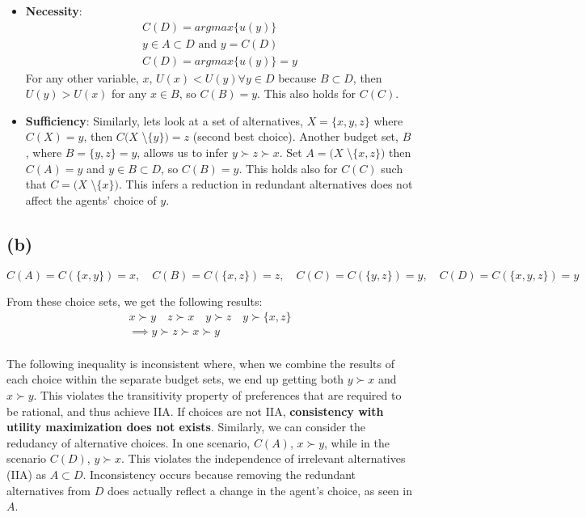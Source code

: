 \documentclass{article}
\begin{document}
\begin{itemize}
    \item \textbf{Necessity}:
        \begin{gather*}
        C(D) = argmax \{ u(y)\} \\
        y \in A\subset D \text{ and } y = C(D) \\ 
        C(D) = argmax \{ u(y)\} = y 
        \end{gather*}
    For any other variable, $x$, $U(x) < U(y) \forall y \in D$   because $B \subset D$, then $U(y) > U(x)$ for any $x \in B$, so $C(B) = y$. This also holds for $C(C)$.

    \item \textbf{Sufficiency}: Similarly, lets look at a set of alternatives, $X = \{x,y,z\}$ where $C(X) = y$, then $C(X$ \textbackslash $\{y\}) = z$ (second best choice). Another budget set, $B$, where $B = \{y,z\} = y$, allows us to infer $ y \succ z \succ x$. Set $A = (X$ \textbackslash $\{x,z\})$ then $C(A) = y$ and $y \in B \subset D$, so $C(B) = y$. This holds also for $C(C)$ such that $C = (X$ \textbackslash $\{x\})$. This infers a reduction in redundant alternatives does not affect the agents' choice of $y$. 
\end{itemize}

\subsection*{(b)}

\[
C(A) = C(\{x, y\}) = x, \quad C(B) = C(\{x, z\}) = z, \quad C(C) = C(\{y, z\}) = y, \quad C(D) = C(\{x, y, z\}) = y
\]

From these choice sets, we get the following results: 
\begin{gather*}
    x \succ y \quad z \succ x \quad y \succ z \quad y \succ \{x,z\} \\
    \implies y \succ z \succ x \succ y 
\end{gather*}
\\
The following inequality is inconsistent where, when we combine the results of each choice within the separate budget sets, we end up getting both $y \succ x$ and $ x \succ y$. This violates the transitivity property of preferences that are required to be rational, and thus achieve IIA. If choices are not IIA, \textbf{consistency with utility maximization does not exists}. Similarly, we can consider the redudancy of alternative choices. In one scenario, $C(A)$, $x \succ y$, while in the scenario $C(D)$, $y \succ x$. This violates the independence of irrelevant alternatives (IIA) as $A \subset D$. Inconsistency occurs because removing the redundant alternatives from $D$ does actually reflect a change in the agent's choice, as seen in $A$. 
\end{document}
